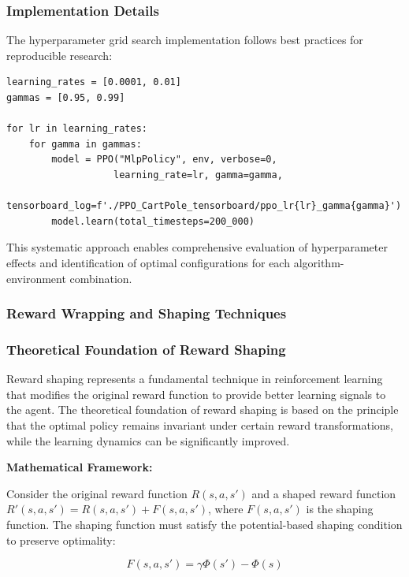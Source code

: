 \documentclass[12pt]{article}
\begin{document}
{{{\subsubsection{Implementation Details}

The hyperparameter grid search implementation follows best practices for reproducible research:

\begin{verbatim}
learning_rates = [0.0001, 0.01]  
gammas = [0.95, 0.99]

for lr in learning_rates:
    for gamma in gammas:
        model = PPO("MlpPolicy", env, verbose=0,
                   learning_rate=lr, gamma=gamma,
                   tensorboard_log=f'./PPO_CartPole_tensorboard/ppo_lr{lr}_gamma{gamma}')
        model.learn(total_timesteps=200_000)
\end{verbatim}

This systematic approach enables comprehensive evaluation of hyperparameter effects and identification of optimal configurations for each algorithm-environment combination.

\subsubsection{Reward Wrapping and Shaping Techniques}

\subsubsection{Theoretical Foundation of Reward Shaping}

Reward shaping represents a fundamental technique in reinforcement learning that modifies the original reward function to provide better learning signals to the agent. The theoretical foundation of reward shaping is based on the principle that the optimal policy remains invariant under certain reward transformations, while the learning dynamics can be significantly improved.

\textbf{Mathematical Framework:}

Consider the original reward function $R(s,a,s')$ and a shaped reward function $R'(s,a,s') = R(s,a,s') + F(s,a,s')$, where $F(s,a,s')$ is the shaping function. The shaping function must satisfy the potential-based shaping condition to preserve optimality:

\begin{equation}
F(s,a,s') = \gamma \Phi(s') - \Phi(s)
\end{equation}

}}}
\end{document}
